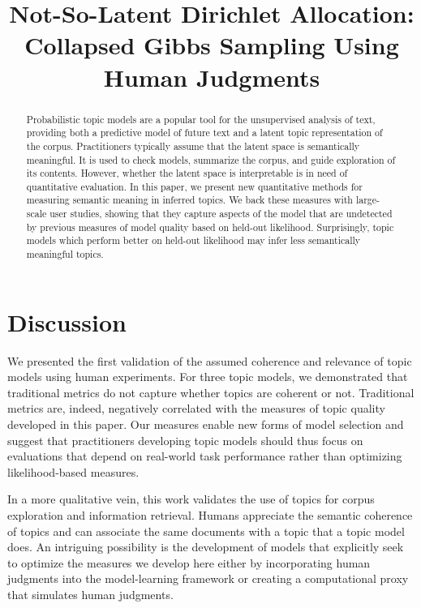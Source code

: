 \documentclass[11pt,letterpaper]{article}
\title{Not-So-Latent Dirichlet Allocation: \\ 
       Collapsed Gibbs Sampling Using Human Judgments}
\author{}
\begin{document}
\maketitle
\vspace{-.1in}
\begin{abstract}%
  Probabilistic topic models are a popular tool for the unsupervised
  analysis of text, providing both a predictive model of future text
  and a latent topic representation of the corpus.  Practitioners
  typically assume that the latent space is semantically meaningful.
  It is used to check models, summarize the corpus, and guide
  exploration of its contents.  However, whether the latent space is
  interpretable is in need of quantitative evaluation.  In this paper,
  we present new quantitative methods for measuring semantic meaning
  in inferred topics.  We back these measures with large-scale user
  studies, showing that they capture aspects of the model that are
  undetected by previous measures of model quality based on held-out
  likelihood.  Surprisingly, topic models which perform better on
  held-out likelihood may infer less semantically meaningful topics.
\end{abstract}





\section{Discussion}

We presented the first validation of the assumed coherence and
relevance of topic models using human experiments.
For three topic models, we demonstrated that traditional metrics do
not capture whether topics are coherent or not.  Traditional metrics
are, indeed, negatively correlated with the measures of topic quality
developed in this paper.  Our measures enable new forms of model
selection and suggest that practitioners developing topic models should
thus focus on evaluations that depend on real-world task performance
rather than optimizing likelihood-based measures.

In a more qualitative vein, this work validates the use of topics for
corpus exploration and information retrieval.  Humans appreciate the
semantic coherence of topics and can associate the same documents with
a topic that a topic model does.  An intriguing possibility is the
development of models that explicitly seek to optimize the measures we
develop here either by incorporating human judgments into the
model-learning framework or creating a computational proxy that
simulates human judgments.



\small


\end{document}
